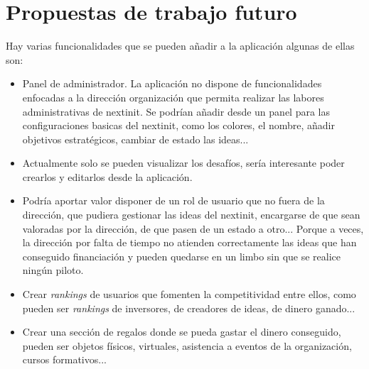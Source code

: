 \section{Propuestas de trabajo futuro}

Hay varias funcionalidades que se pueden añadir a la aplicación algunas de ellas son:
\begin{itemize}
	\item Panel de administrador. La aplicación no dispone de funcionalidades enfocadas a 
	la dirección organización que permita realizar las labores administrativas de nextinit. Se podrían
	añadir desde un panel para las configuraciones basicas del nextinit, como los colores, el nombre, 
	añadir objetivos estratégicos, cambiar de estado las ideas...
	\item Actualmente solo se pueden visualizar los desafíos, sería interesante poder crearlos y 
	editarlos desde la aplicación.
	\item Podría aportar valor disponer de un rol de usuario que no fuera de la dirección, que pudiera
	gestionar las ideas del nextinit, encargarse de que sean valoradas por la dirección, de que
	pasen de un estado a otro... Porque a veces, la dirección por falta de tiempo no atienden correctamente
	las ideas que han conseguido financiación y pueden quedarse en un limbo sin que se realice ningún
	piloto.
	\item Crear \textit{rankings} de usuarios que fomenten la competitividad entre ellos, como pueden ser 
	\textit{rankings} de inversores, de creadores de ideas, de dinero ganado...
	\item Crear una sección de regalos donde se pueda gastar el dinero conseguido, pueden ser objetos físicos, virtuales, asistencia a eventos de la organización, cursos formativos...
\end{itemize}



